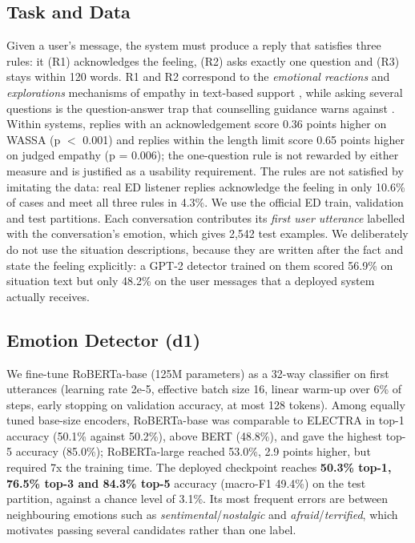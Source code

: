 \documentclass[conference,a4paper]{IEEEtran}
\begin{document}
\subsection{Task and Data}
Given a user's message, the system must produce a reply that satisfies three rules: it (R1) acknowledges the feeling, (R2) asks exactly one question and (R3) stays within 120 words. R1 and R2 correspond to the \emph{emotional reactions} and \emph{explorations} mechanisms of empathy in text-based support \cite{b18}, while asking several questions is the question-answer trap that counselling guidance warns against \cite{b19}. Within systems, replies with an acknowledgement score 0.36 points higher on WASSA (p $<$ 0.001) and replies within the length limit score 0.65 points higher on judged empathy (p = 0.006); the one-question rule is not rewarded by either measure and is justified as a usability requirement. The rules are not satisfied by imitating the data: real ED listener replies acknowledge the feeling in only 10.6\% of cases and meet all three rules in 4.3\%. We use the official ED train, validation and test partitions. Each conversation contributes its \emph{first user utterance} labelled with the conversation's emotion, which gives 2,542 test examples. We deliberately do not use the situation descriptions, because they are written after the fact and state the feeling explicitly: a GPT-2 detector trained on them scored 56.9\% on situation text but only 48.2\% on the user messages that a deployed system actually receives.


\subsection{Emotion Detector (d1)}
We fine-tune RoBERTa-base \cite{b20} (125M parameters) as a 32-way classifier on first utterances (learning rate 2e-5, effective batch size 16, linear warm-up over 6\% of steps, early stopping on validation accuracy, at most 128 tokens). Among equally tuned base-size encoders, RoBERTa-base was comparable to ELECTRA in top-1 accuracy (50.1\% against 50.2\%), above BERT (48.8\%), and gave the highest top-5 accuracy (85.0\%); RoBERTa-large reached 53.0\%, 2.9 points higher, but required 7x the training time. The deployed checkpoint reaches \textbf{50.3\% top-1, 76.5\% top-3 and 84.3\% top-5} accuracy (macro-F1 49.4\%) on the test partition, against a chance level of 3.1\%. Its most frequent errors are between neighbouring emotions such as \emph{sentimental}/\emph{nostalgic} and \emph{afraid}/\emph{terrified}, which motivates passing several candidates rather than one label.
\end{document}

